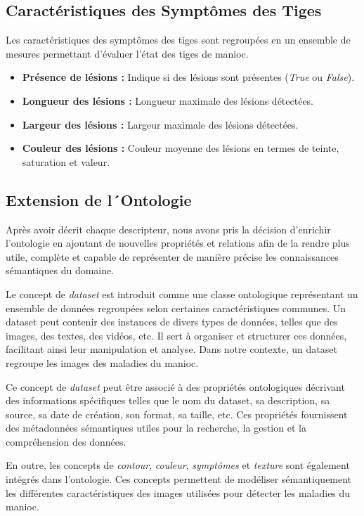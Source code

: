 \documentclass{article}
\begin{document}
	\subsection*{Caractéristiques des Symptômes des Tiges}
	
	Les caractéristiques des symptômes des tiges sont regroupées en un ensemble de mesures permettant d'évaluer l'état des tiges de manioc.
	
	\begin{itemize}
		\item \textbf{Présence de lésions :} Indique si des lésions sont présentes (\textit{True} ou \textit{False}).
		\item \textbf{Longueur des lésions :} Longueur maximale des lésions détectées.
		\item \textbf{Largeur des lésions :} Largeur maximale des lésions détectées.
		\item \textbf{Couleur des lésions :} Couleur moyenne des lésions en termes de teinte, saturation et valeur.
	\end{itemize}
	
	\subsection{Extension de l´Ontologie}
	
	Après avoir décrit chaque descripteur, nous avons pris la décision d'enrichir l'ontologie en ajoutant de nouvelles propriétés et relations afin de la rendre plus utile, complète et capable de représenter de manière précise les connaissances sémantiques du domaine.
	
	Le concept de \textit{dataset} est introduit comme une classe ontologique représentant un ensemble de données regroupées selon certaines caractéristiques communes. Un dataset peut contenir des instances de divers types de données, telles que des images, des textes, des vidéos, etc. Il sert à organiser et structurer ces données, facilitant ainsi leur manipulation et analyse. Dans notre contexte, un dataset regroupe les images des maladies du manioc.
	
	Ce concept de \textit{dataset} peut être associé à des propriétés ontologiques décrivant des informations spécifiques telles que le nom du dataset, sa description, sa source, sa date de création, son format, sa taille, etc. Ces propriétés fournissent des métadonnées sémantiques utiles pour la recherche, la gestion et la compréhension des données.
	
	En outre, les concepts de \textit{contour}, \textit{couleur}, \textit{symptômes} et \textit{texture} sont également intégrés dans l'ontologie. Ces concepts permettent de modéliser sémantiquement les différentes caractéristiques des images utilisées pour détecter les maladies du manioc.
	
\end{document}
